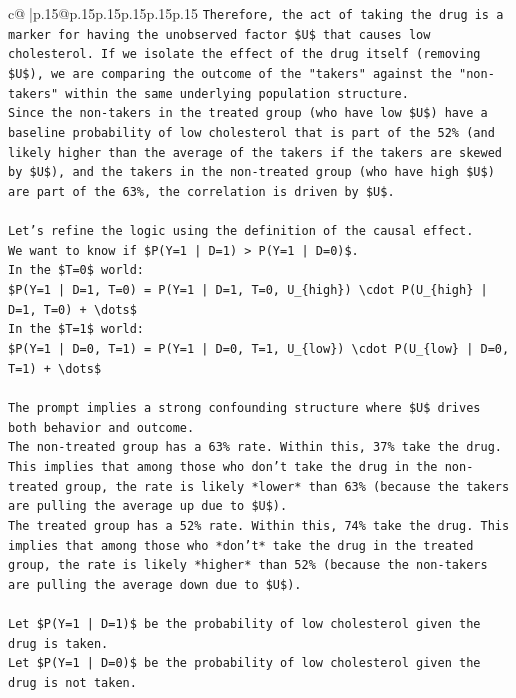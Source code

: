 \documentclass{article}
\begin{document}
{\begin{supertabular}{c@{$\;$}|p{.15\linewidth}@{}p{.15\linewidth}p{.15\linewidth}p{.15\linewidth}p{.15\linewidth}p{.15\linewidth}}
{{{\texttt{Therefore, the act of taking the drug is a marker for having the unobserved factor \$U\$ that causes low cholesterol. If we isolate the effect of the drug itself (removing \$U\$), we are comparing the outcome of the "takers" against the "non{-}takers" within the same underlying population structure.} \\
\texttt{Since the non{-}takers in the treated group (who have low \$U\$) have a baseline probability of low cholesterol that is part of the 52\% (and likely higher than the average of the takers if the takers are skewed by \$U\$), and the takers in the non{-}treated group (who have high \$U\$) are part of the 63\%, the correlation is driven by \$U\$.} \\
\\ 
\texttt{Let's refine the logic using the definition of the causal effect.} \\
\texttt{We want to know if \$P(Y=1 | D=1) > P(Y=1 | D=0)\$.} \\
\texttt{In the \$T=0\$ world:} \\
\texttt{\$P(Y=1 | D=1, T=0) = P(Y=1 | D=1, T=0, U\_\{high\}) \textbackslash{}cdot P(U\_\{high\} | D=1, T=0) + \textbackslash{}dots\$} \\
\texttt{In the \$T=1\$ world:} \\
\texttt{\$P(Y=1 | D=0, T=1) = P(Y=1 | D=0, T=1, U\_\{low\}) \textbackslash{}cdot P(U\_\{low\} | D=0, T=1) + \textbackslash{}dots\$} \\
\\ 
\texttt{The prompt implies a strong confounding structure where \$U\$ drives both behavior and outcome.} \\
\texttt{The non{-}treated group has a 63\% rate. Within this, 37\% take the drug. This implies that among those who don't take the drug in the non{-}treated group, the rate is likely *lower* than 63\% (because the takers are pulling the average up due to \$U\$).} \\
\texttt{The treated group has a 52\% rate. Within this, 74\% take the drug. This implies that among those who *don't* take the drug in the treated group, the rate is likely *higher* than 52\% (because the non{-}takers are pulling the average down due to \$U\$).} \\
\\ 
\texttt{Let \$P(Y=1 | D=1)\$ be the probability of low cholesterol given the drug is taken.} \\
\texttt{Let \$P(Y=1 | D=0)\$ be the probability of low cholesterol given the drug is not taken.} \\
}}}
\end{supertabular}}
\end{document}
